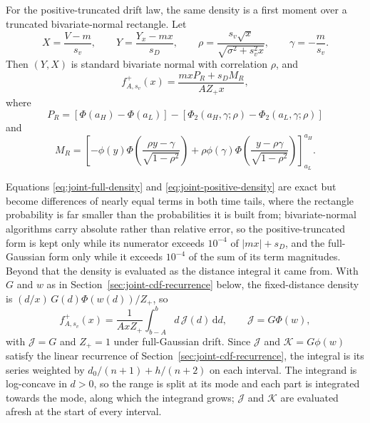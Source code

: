 \documentclass[12pt]{article}
\newcommand{\dd}{\,\mathrm{d}}
\newcommand{\PhiN}{\Phi}
\newcommand{\phiN}{\phi}
\newcommand{\PhiTwo}{\Phi_2}
\begin{document}
For the positive-truncated drift law, the same density is a first moment over a truncated bivariate-normal rectangle. Let
\begin{equation}
  X=\frac{V-m}{s_v},
  \qquad
  Y=\frac{Y_x-mx}{s_D},
  \qquad
  \rho=\frac{s_v\sqrt{x}}{\sqrt{\sigma^2+s_v^2x}},
  \qquad
  \gamma=-\frac{m}{s_v}.
\end{equation}
Then $(Y,X)$ is standard bivariate normal with correlation $\rho$, and
\begin{equation}
  f_{A,s_v}^{+}(x)=\frac{mxP_R+s_DM_R}{AZ_+x},
  \label{eq:joint-positive-density}
\end{equation}
where
\begin{equation}
  P_R=\left[\PhiN(a_H)-\PhiN(a_L)\right]
  -\left[\PhiTwo(a_H,\gamma;\rho)-\PhiTwo(a_L,\gamma;\rho)\right]
\end{equation}
and
\begin{equation}
  M_R=\left[
  -\phiN(y)\PhiN\!\left(\frac{\rho y-\gamma}{\sqrt{1-\rho^2}}\right)
  +\rho\phiN(\gamma)
  \PhiN\!\left(\frac{y-\rho\gamma}{\sqrt{1-\rho^2}}\right)
  \right]_{a_L}^{a_H}.
\end{equation}

Equations \eqref{eq:joint-full-density} and \eqref{eq:joint-positive-density} are exact but become differences of nearly equal terms in both time tails, where the rectangle probability is far smaller than the probabilities it is built from; bivariate-normal algorithms carry absolute rather than relative error, so the positive-truncated form is kept only while its numerator exceeds $10^{-4}$ of $|mx|+s_D$, and the full-Gaussian form only while it exceeds $10^{-4}$ of the sum of its term magnitudes. Beyond that the density is evaluated as the distance integral it came from. With $G$ and $w$ as in Section~\ref{sec:joint-cdf-recurrence} below, the fixed-distance density is $(d/x)\,G(d)\PhiN(w(d))/Z_+$, so
\begin{equation}
 f_{A,s_v}^{+}(x)=\frac{1}{AxZ_+}\int_{b-A}^{b}d\,\mathcal J(d)\dd d,
 \qquad \mathcal J=G\PhiN(w),
 \label{eq:joint-density-integral}
\end{equation}
with $\mathcal J=G$ and $Z_+=1$ under full-Gaussian drift. Since $\mathcal J$ and $\mathcal K=G\phiN(w)$ satisfy the linear recurrence of Section~\ref{sec:joint-cdf-recurrence}, the integral is its series weighted by $d_0/(n+1)+h/(n+2)$ on each interval. The integrand is log-concave in $d>0$, so the range is split at its mode and each part is integrated towards the mode, along which the integrand grows; $\mathcal J$ and $\mathcal K$ are evaluated afresh at the start of every interval.
\end{document}
